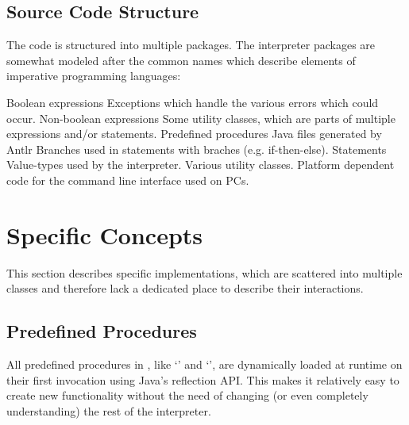 \subsection{Source Code Structure}\label{srcStructure}

The code is structured into multiple packages. The interpreter packages are somewhat modeled after the common names which describe elements of imperative programming languages:

\begin{itemize}
			{Boolean expressions}
			{Exceptions which handle the various errors which could occur.}
			{Non-boolean expressions}
			{Some utility classes, which are parts of multiple expressions and\slash{}or statements.}
			{Predefined procedures}
			{Java files generated by Antlr}
			{Branches used in statements with braches (e.g. if-then-else).}
			{Statements}
			{Value-types used by the interpreter.}
			{Various utility classes.}
			{Platform dependent code for the command line interface used on PCs.}
\end{itemize}

\section{Specific Concepts}\label{specificConcepts}

This section describes specific implementations, which are scattered into multiple classes and therefore lack a dedicated place to describe their interactions.

\subsection{Predefined Procedures}

All predefined procedures in \setlX{}, like `' and `', are dynamically loaded at runtime on their first invocation using Java's reflection API. This makes it relatively easy to create new functionality without the need of changing (or even completely understanding) the rest of the interpreter.

